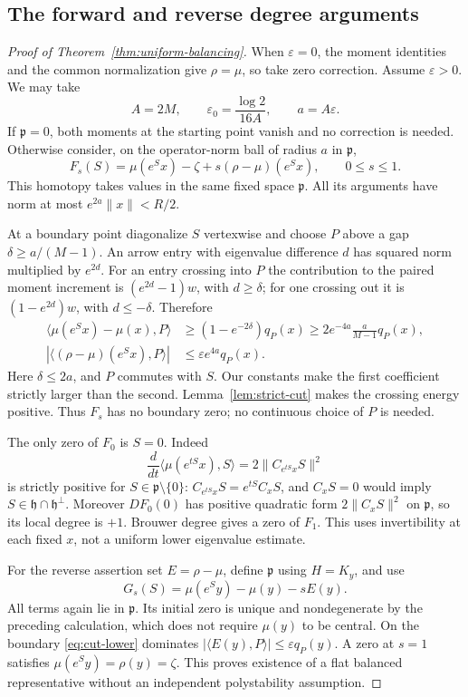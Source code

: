 \subsection{The forward and reverse degree arguments}
\begin{proof}[Proof of Theorem~\ref{thm:uniform-balancing}]
When $\varepsilon=0$, the moment identities and the common
normalization give $\rho=\mu$, so take zero correction. Assume
$\varepsilon>0$. We may take
\[
 A=2M,\qquad \varepsilon_0=\frac{\log2}{16A},\qquad a=A\varepsilon.
\]
If $\mathfrak p=0$, both moments at the starting point vanish and no
correction is needed. Otherwise consider, on the operator-norm ball of
radius $a$ in $\mathfrak p$,
\[
 F_s(S)=\mu(e^Sx)-\zeta+s(\rho-\mu)(e^Sx),\qquad 0\le s\le1.
\]
This homotopy takes values in the same fixed space $\mathfrak p$.
All its arguments have norm at most $e^{2a}\|x\|<R/2$.

At a boundary point diagonalize $S$ vertexwise and choose $P$ above
a gap $\delta\ge a/(M-1)$. An arrow entry with eigenvalue difference
$d$ has squared norm multiplied by $e^{2d}$. For an entry crossing
into $P$ the contribution to the paired moment increment is
$(e^{2d}-1)w$, with $d\ge\delta$; for one crossing out it is
$(1-e^{2d})w$, with $d\le-\delta$. Therefore
\begin{align}
 \langle\mu(e^Sx)-\mu(x),P\rangle
 &\ge(1-e^{-2\delta})q_P(x)
 \ge 2e^{-4a}\frac{a}{M-1}q_P(x), \label{eq:cut-lower}\\
 |\langle(\rho-\mu)(e^Sx),P\rangle|
 &\le\varepsilon e^{4a}q_P(x).                    \label{eq:cut-error}
\end{align}
Here $\delta\le2a$, and $P$ commutes with $S$.
Our constants make the first coefficient strictly larger than the
second. Lemma~\ref{lem:strict-cut} makes the crossing energy positive.
Thus $F_s$ has no boundary zero; no continuous choice of $P$ is needed.

The only zero of $F_0$ is $S=0$. Indeed
\[
 \frac{d}{dt}\langle\mu(e^{tS}x),S\rangle
   =2\|C_{e^{tS}x}S\|^2
\]
is strictly positive for $S\in\mathfrak p\setminus\{0\}$:
$C_{e^{tS}x}S=e^{tS}C_xS$, and $C_xS=0$ would imply
$S\in\mathfrak h\cap\mathfrak h^\perp$.
Moreover $DF_0(0)$ has positive quadratic form $2\|C_xS\|^2$ on
$\mathfrak p$, so its local degree is $+1$.
Brouwer degree gives a zero of $F_1$. This uses invertibility at each
fixed $x$, not a uniform lower eigenvalue estimate.

For the reverse assertion set $E=\rho-\mu$, define $\mathfrak p$
using $H=K_y$, and use
\[
 G_s(S)=\mu(e^Sy)-\mu(y)-sE(y).
\]
All terms again lie in $\mathfrak p$. Its initial zero is unique and
nondegenerate by the preceding calculation, which does not require
$\mu(y)$ to be central. On the boundary \eqref{eq:cut-lower} dominates
$|\langle E(y),P\rangle|\le\varepsilon q_P(y)$.
A zero at $s=1$ satisfies $\mu(e^Sy)=\rho(y)=\zeta$.
This proves existence of a flat balanced representative without an
independent polystability assumption.


\end{proof}

